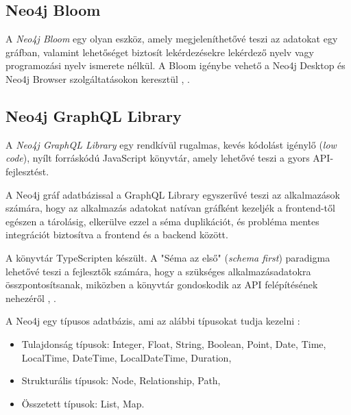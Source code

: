 \subsection{Neo4j Bloom}

A \textit{Neo4j Bloom} egy olyan eszköz, amely megjeleníthetővé teszi az adatokat egy gráfban, valamint lehetőséget biztosít lekérdezésekre lekérdező nyelv vagy programozási nyelv ismerete nélkül. A Bloom igénybe vehető a Neo4j Desktop és Neo4j Browser szolgáltatásokon keresztül \cite{neo4j-bloom1}, \cite{neo4j-bloom2}.

\subsection{Neo4j GraphQL Library}

A \textit{Neo4j GraphQL Library} egy rendkívül rugalmas, kevés kódolást igénylő (\textit{low code}), nyílt forráskódú JavaScript könyvtár, amely lehetővé teszi a gyors API-fejlesztést.

A Neo4j gráf adatbázissal a GraphQL Library egyszerűvé teszi az alkalmazások számára, hogy az alkalmazás adatokat natívan gráfként kezeljék a frontend-től egészen a tárolásig, elkerülve ezzel a séma duplikációt, és probléma mentes integrációt biztosítva a frontend és a backend között.

A könyvtár TypeScripten készült. A "Séma az első" (\textit{schema first}) paradigma lehetővé teszi a fejlesztők számára, hogy a szükséges alkalmazásadatokra összpontosítsanak, miközben a könyvtár gondoskodik az API felépítésének nehezéről  \cite{neo4j-graphql-library1}, \cite{neo4j-graphql-library2}.



A Neo4j egy típusos adatbázis, ami az alábbi típusokat tudja kezelni \cite{neo4j-values}:
\begin{itemize}
    \item Tulajdonság típusok: Integer, Float, String, Boolean, Point, Date, Time, LocalTime, DateTime, LocalDateTime, Duration,
    \item Strukturális típusok: Node, Relationship, Path,
    \item Összetett típusok: List, Map.
\end{itemize}

